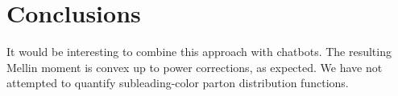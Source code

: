 \section{Conclusions}\label{sec:conclusions}

It would be interesting to combine this approach with chatbots. The
resulting Mellin moment is convex up to power corrections, as expected.
We have not attempted to quantify subleading-color parton distribution
functions.

